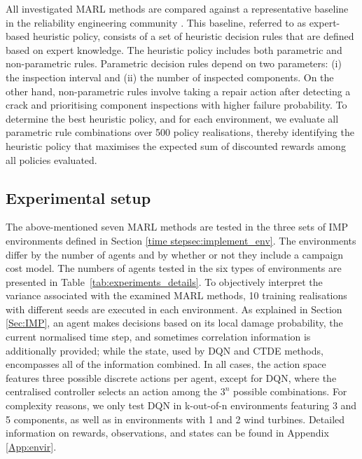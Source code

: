 All investigated MARL methods are compared against a representative baseline in the reliability engineering community \citep{LuqueDBN2019,morato2022syst}.
This baseline, referred to as expert-based heuristic policy, consists of a set of heuristic decision rules that are defined based on expert knowledge.
The heuristic policy includes both parametric and non-parametric rules.
Parametric decision rules depend on two parameters: (i) the inspection interval and (ii) the number of inspected components.
On the other hand, non-parametric rules involve taking a repair action after detecting a crack and prioritising component inspections with higher failure probability.
To determine the best heuristic policy, and for each environment, we evaluate all parametric rule combinations over 500 policy realisations, thereby identifying the heuristic policy that maximises the expected sum of discounted rewards among all policies evaluated.

\subsection{Experimental setup}

The above-mentioned seven MARL methods are tested in the three sets of IMP environments defined in Section \ref{time stepsec:implement_env}.
The environments differ by the number of agents and by whether or not they include a campaign cost model.
The numbers of agents tested in the six types of environments are presented in Table~\ref{tab:experiments_details}.
To objectively interpret the variance associated with the examined MARL methods, 10 training realisations with different seeds are executed in each environment.
As explained in Section \ref{Sec:IMP}, an agent makes decisions based on its local damage probability, the current normalised time step, and sometimes correlation information is additionally provided; while the state, used by DQN and CTDE methods, encompasses all of the information combined.
In all cases, the action space features three possible discrete actions per agent, except for DQN, where the centralised controller selects an action among the $3^n$ possible combinations.
For complexity reasons, we only test DQN in k-out-of-n environments featuring 3 and 5 components, as well as in environments with 1 and 2 wind turbines.
Detailed information on rewards, observations, and states can be found in Appendix \ref{App:envir}.

